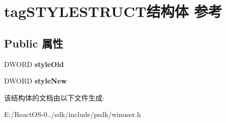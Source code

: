 \hypertarget{structtag_s_t_y_l_e_s_t_r_u_c_t}{}\section{tag\+S\+T\+Y\+L\+E\+S\+T\+R\+U\+C\+T结构体 参考}
\label{structtag_s_t_y_l_e_s_t_r_u_c_t}
\subsection*{Public 属性}
\begin{DoxyCompactItemize}
\item 
\mbox{\label{structtag_s_t_y_l_e_s_t_r_u_c_t_ac64d64f406aa4c8861e3afc60db14a32}} 
D\+W\+O\+RD {\bfseries style\+Old}
\item 
\mbox{\label{structtag_s_t_y_l_e_s_t_r_u_c_t_a585e27b21d55a10e72abfbb82115d4b4}} 
D\+W\+O\+RD {\bfseries style\+New}
\end{DoxyCompactItemize}


该结构体的文档由以下文件生成\+:\begin{DoxyCompactItemize}
\item 
E\+:/\+React\+O\+S-\/0../sdk/include/psdk/winuser.\+h\end{DoxyCompactItemize}
